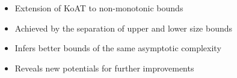 \begin{itemize}
\item Extension of KoAT to non-monotonic bounds
\item Achieved by the separation of upper and lower size bounds
\item Infers better bounds of the same asymptotic complexity
\item Reveals new potentials for further improvements
\end{itemize}
